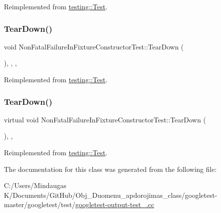 Reimplemented from \mbox{\hyperlink{classtesting_1_1_test_a5f0ab439802cbe0ef7552f1a9f791923}{testing\+::\+Test}}.

\mbox{\label{class_non_fatal_failure_in_fixture_constructor_test_ad5d87bdc012dc66c008e7891008eb6a8}} 
\subsubsection{\texorpdfstring{TearDown()}{TearDown()}\hspace{0.1cm}{\footnotesize\ttfamily [2/3]}}
{\footnotesize\ttfamily void Non\+Fatal\+Failure\+In\+Fixture\+Constructor\+Test\+::\+Tear\+Down (\begin{DoxyParamCaption}{ }\end{DoxyParamCaption})\hspace{0.3cm}{\ttfamily [inline]}, {\ttfamily [override]}, {\ttfamily [protected]}, {\ttfamily [virtual]}}



Reimplemented from \mbox{\hyperlink{classtesting_1_1_test_a5f0ab439802cbe0ef7552f1a9f791923}{testing\+::\+Test}}.

\mbox{\label{class_non_fatal_failure_in_fixture_constructor_test_ab76d79c346d9a378d625fde5739e8ad6}} 
\subsubsection{\texorpdfstring{TearDown()}{TearDown()}\hspace{0.1cm}{\footnotesize\ttfamily [3/3]}}
{\footnotesize\ttfamily virtual void Non\+Fatal\+Failure\+In\+Fixture\+Constructor\+Test\+::\+Tear\+Down (\begin{DoxyParamCaption}{ }\end{DoxyParamCaption})\hspace{0.3cm}{\ttfamily [inline]}, {\ttfamily [protected]}, {\ttfamily [virtual]}}



Reimplemented from \mbox{\hyperlink{classtesting_1_1_test_a5f0ab439802cbe0ef7552f1a9f791923}{testing\+::\+Test}}.



The documentation for this class was generated from the following file\+:\begin{DoxyCompactItemize}
\item 
C\+:/\+Users/\+Mindaugas K/\+Documents/\+Git\+Hub/\+Obj\+\_\+\+Duomenu\+\_\+apdorojimas\+\_\+class/googletest-\/master/googletest/test/\mbox{\hyperlink{googletest-master_2googletest_2test_2googletest-output-test___8cc}{googletest-\/output-\/test\+\_\+.\+cc}}\end{DoxyCompactItemize}
